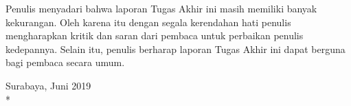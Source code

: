 Penulis menyadari bahwa laporan Tugas Akhir ini masih memiliki banyak kekurangan. Oleh karena itu dengan segala kerendahan hati penulis mengharapkan kritik dan saran dari pembaca untuk perbaikan penulis kedepannya. Selain itu, penulis berharap laporan Tugas Akhir ini dapat berguna bagi pembaca secara umum.

\begin{flushright}
Surabaya, Juni 2019 \\*
\vspace{5em}
\penulis
\end{flushright}